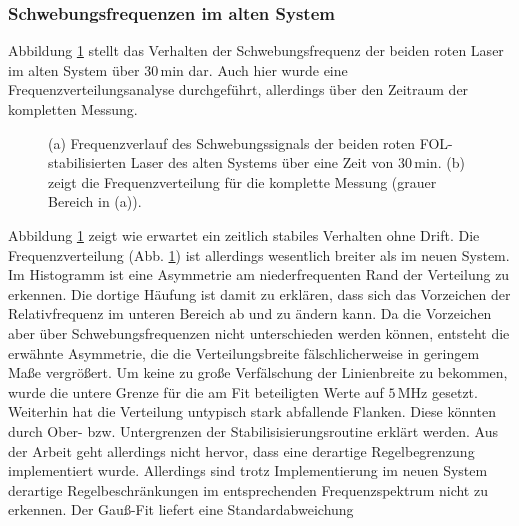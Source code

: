 \subsubsection{Schwebungsfrequenzen im alten
System}\label{subsubsec:beatfrequenzmessung_altes_system}
Abbildung \ref{fig:beatfrequenzen_alt_FOL} stellt das Verhalten der
Schwebungsfrequenz der beiden roten Laser im alten System über $30\,$min dar.
Auch hier wurde eine Frequenzverteilungsanalyse durchgeführt, allerdings über
den Zeitraum der kompletten Messung.
\begin{figure}[hp]
 	\centering
 	\footnotesize
 	\fbox{\parbox{\dimexpr \linewidth - 2\fboxrule - 2\fboxsep}{
 	\subfloat[]{
		\label{subfig:beatfrequenzen_alt_FOL_drift}
		
		}\\
 	\subfloat[]{
		\label{subfig:beatfrequenzen_alt_FOL_histogramm}
		
		}
	}}
	\caption[Schwebungsfrequenzen - altes System mit FOL]{(a) Frequenzverlauf des
	Schwebungssignals der beiden roten FOL-stabilisierten Laser des alten Systems
	über eine Zeit von $30\,$min. (b) zeigt die Frequenzverteilung für die
	komplette Messung (grauer Bereich in (a)).}
	\label{fig:beatfrequenzen_alt_FOL}
\end{figure}
Abbildung
\ref{fig:beatfrequenzen_alt_FOL}
zeigt wie erwartet ein zeitlich stabiles Verhalten ohne Drift. Die
Frequenzverteilung (Abb.
\ref{fig:beatfrequenzen_alt_FOL})
ist allerdings wesentlich breiter als im neuen System. Im Histogramm ist eine Asymmetrie am niederfrequenten Rand der
Verteilung zu erkennen. Die dortige Häufung ist damit zu erklären, dass sich das Vorzeichen
der Relativfrequenz im unteren Bereich ab und zu ändern kann. Da die Vorzeichen
aber über Schwebungsfrequenzen nicht unterschieden werden können, entsteht die erwähnte
Asymmetrie, die die Verteilungsbreite fälschlicherweise in geringem Maße
vergrößert. Um keine zu große Verfälschung der Linienbreite zu bekommen, wurde die untere Grenze für die am
Fit beteiligten Werte auf $5\,$MHz gesetzt. Weiterhin hat die Verteilung
untypisch stark abfallende Flanken. Diese könnten durch Ober- bzw.
Untergrenzen der Stabilisisierungsroutine erklärt werden. Aus der Arbeit
\cite{kuschnick:2000:diplomarbeit} geht allerdings nicht hervor, dass eine
derartige Regelbegrenzung implementiert wurde. Allerdings sind trotz
Implementierung im neuen System derartige Regelbeschränkungen im entsprechenden
Frequenzspektrum nicht zu erkennen. Der Gauß-Fit liefert eine Standardabweichung
